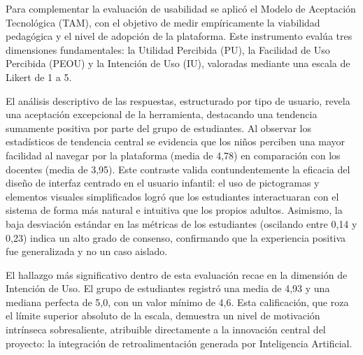Para complementar la evaluación de usabilidad se aplicó el Modelo de Aceptación Tecnológica (TAM), con el objetivo de medir empíricamente la viabilidad pedagógica y el nivel de adopción de la plataforma. Este instrumento evalúa tres dimensiones fundamentales: la Utilidad Percibida (PU), la Facilidad de Uso Percibida (PEOU) y la Intención de Uso (IU), valoradas mediante una escala de Likert de 1 a 5.

El análisis descriptivo de las respuestas, estructurado por tipo de usuario, revela una aceptación excepcional de la herramienta, destacando una tendencia sumamente positiva por parte del grupo de estudiantes. Al observar los estadísticos de tendencia central se evidencia que los niños perciben una mayor facilidad al navegar por la plataforma (media de 4,78) en comparación con los docentes (media de 3,95). Este contraste valida contundentemente la eficacia del diseño de interfaz centrado en el usuario infantil: el uso de pictogramas y elementos visuales simplificados logró que los estudiantes interactuaran con el sistema de forma más natural e intuitiva que los propios adultos. Asimismo, la baja desviación estándar en las métricas de los estudiantes (oscilando entre 0,14 y 0,23) indica un alto grado de consenso, confirmando que la experiencia positiva fue generalizada y no un caso aislado.

El hallazgo más significativo dentro de esta evaluación recae en la dimensión de Intención de Uso. El grupo de estudiantes registró una media de 4,93 y una mediana perfecta de 5,0, con un valor mínimo de 4,6. Esta calificación, que roza el límite superior absoluto de la escala, demuestra un nivel de motivación intrínseca sobresaliente, atribuible directamente a la innovación central del proyecto: la integración de retroalimentación generada por Inteligencia Artificial.

